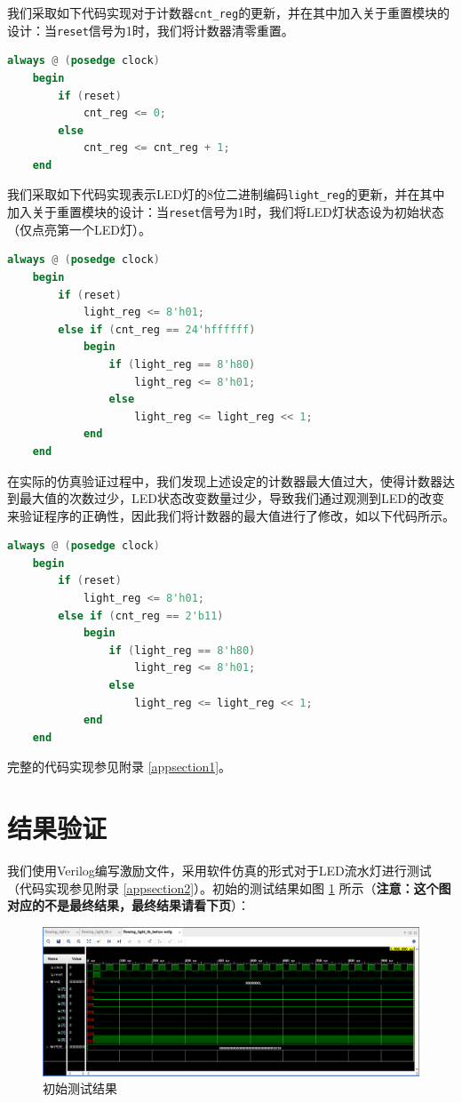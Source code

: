 \documentclass{cumcm}
\numberwithin{equation}{section}
\numberwithin{equation}{subsection}
\begin{document}
我们采取如下代码实现对于计数器\texttt{cnt\_reg}的更新，并在其中加入关于重置模块的设计：当\texttt{reset}信号为1时，我们将计数器清零重置。

\begin{lstlisting}[language=verilog]
always @ (posedge clock)
    begin
        if (reset)
            cnt_reg <= 0;
        else
            cnt_reg <= cnt_reg + 1;
    end
\end{lstlisting}

我们采取如下代码实现表示LED灯的8位二进制编码\texttt{light\_reg}的更新，并在其中加入关于重置模块的设计：当\texttt{reset}信号为1时，我们将LED灯状态设为初始状态（仅点亮第一个LED灯）。

\begin{lstlisting}[language=verilog]
always @ (posedge clock)
    begin
        if (reset)
            light_reg <= 8'h01;
        else if (cnt_reg == 24'hffffff)
            begin
                if (light_reg == 8'h80)
                    light_reg <= 8'h01;
                else
                    light_reg <= light_reg << 1;
            end
    end
\end{lstlisting}

在实际的仿真验证过程中，我们发现上述设定的计数器最大值过大，使得计数器达到最大值的次数过少，LED状态改变数量过少，导致我们通过观测到LED的改变来验证程序的正确性，因此我们将计数器的最大值进行了修改，如以下代码所示。

\begin{lstlisting}[language=verilog]
always @ (posedge clock)
    begin
        if (reset)
            light_reg <= 8'h01;
        else if (cnt_reg == 2'b11)
            begin
                if (light_reg == 8'h80)
                    light_reg <= 8'h01;
                else
                    light_reg <= light_reg << 1;
            end
    end
\end{lstlisting}

完整的代码实现参见附录 \ref{appsection1}。

\section{结果验证}\label{section4}

我们使用Verilog编写激励文件，采用软件仿真的形式对于LED流水灯进行测试（代码实现参见附录 \ref{appsection2}）。初始的测试结果如图 \ref{fig1} 所示（\textbf{注意：这个图对应的不是最终结果，最终结果请看下页}）：

\begin{figure}[htbp]
    \centering
    \includegraphics[width=6.3in]{1.png}
    \caption{初始测试结果}
    \label{fig1}
\end{figure}
\end{document}
